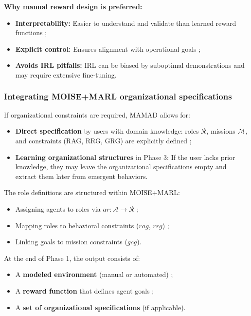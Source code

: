 \documentclass[pdflatex,sn-mathphys-num]{sn-jnl}%
\theoremstyle{thmstyleone}%
\theoremstyle{thmstyletwo}%
\theoremstyle{thmstylethree}%
\begin{document}
\noindent \textbf{Why manual reward design is preferred:}
\begin{itemize}
    \item \textbf{Interpretability:} Easier to understand and validate than learned reward functions ;
    \item \textbf{Explicit control:} Ensures alignment with operational goals ;
    \item \textbf{Avoids IRL pitfalls:} IRL can be biased by suboptimal demonstrations and may require extensive fine-tuning.
\end{itemize}

\subsubsection{Integrating MOISE+MARL organizational specifications}
If organizational constraints are required, MAMAD allows for:
\begin{itemize}
    \item \textbf{Direct specification} by users with domain knowledge: roles $\mathcal{R}$, missions $\mathcal{M}$, and constraints (RAG, RRG, GRG) are explicitly defined ;
    \item \textbf{Learning organizational structures} in Phase 3: If the user lacks prior knowledge, they may leave the organizational specifications empty and extract them later from emergent behaviors.
\end{itemize}

The role definitions are structured within MOISE+MARL:
\begin{itemize}
    \item Assigning agents to roles via $ar: \mathcal{A} \to \mathcal{R}$ ;
    \item Mapping roles to behavioral constraints ($rag$, $rrg$) ;
    \item Linking goals to mission constraints ($gcg$).
\end{itemize}

At the end of Phase 1, the output consists of:
\begin{itemize}
    \item A \textbf{modeled environment} (manual or automated) ;
    \item A \textbf{reward function} that defines agent goals ;
    \item A \textbf{set of organizational specifications} (if applicable).
\end{itemize}

\end{document}
